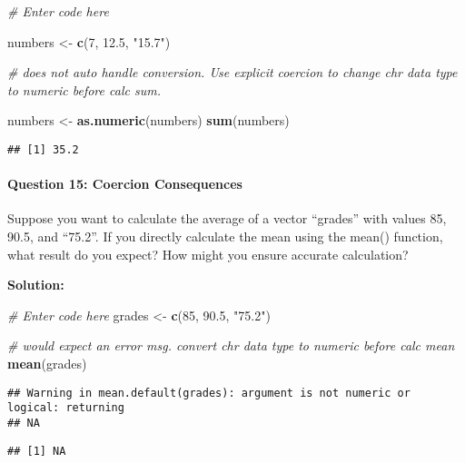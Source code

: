 \documentclass[
]{article}
\newenvironment{Shaded}{\begin{snugshade}}{\end{snugshade}}
\newcommand{\CommentTok}[1]{\textcolor[rgb]{0.56,0.35,0.01}{\textit{#1}}}
\newcommand{\DecValTok}[1]{\textcolor[rgb]{0.00,0.00,0.81}{#1}}
\newcommand{\FloatTok}[1]{\textcolor[rgb]{0.00,0.00,0.81}{#1}}
\newcommand{\FunctionTok}[1]{\textcolor[rgb]{0.13,0.29,0.53}{\textbf{#1}}}
\newcommand{\NormalTok}[1]{#1}
\newcommand{\OtherTok}[1]{\textcolor[rgb]{0.56,0.35,0.01}{#1}}
\newcommand{\StringTok}[1]{\textcolor[rgb]{0.31,0.60,0.02}{#1}}
\begin{document}
\begin{Shaded}
\begin{Highlighting}[]
\CommentTok{\# Enter code here}

\NormalTok{numbers }\OtherTok{\textless{}{-}} \FunctionTok{c}\NormalTok{(}\DecValTok{7}\NormalTok{, }\FloatTok{12.5}\NormalTok{, }\StringTok{"15.7"}\NormalTok{)}

\CommentTok{\# does not auto handle conversion. Use explicit coercion to change chr data type to numeric before calc sum.}

\NormalTok{numbers }\OtherTok{\textless{}{-}} \FunctionTok{as.numeric}\NormalTok{(numbers)}
\FunctionTok{sum}\NormalTok{(numbers)}
\end{Highlighting}
\end{Shaded}

\begin{verbatim}
## [1] 35.2
\end{verbatim}

\hypertarget{question-15-coercion-consequences}{%
\paragraph{Question 15: Coercion
Consequences}\label{question-15-coercion-consequences}}

Suppose you want to calculate the average of a vector ``grades'' with
values 85, 90.5, and ``75.2''. If you directly calculate the mean using
the mean() function, what result do you expect? How might you ensure
accurate calculation?

\textbf{Solution:}

\begin{Shaded}
\begin{Highlighting}[]
\CommentTok{\# Enter code here}
\NormalTok{grades }\OtherTok{\textless{}{-}} \FunctionTok{c}\NormalTok{(}\DecValTok{85}\NormalTok{, }\FloatTok{90.5}\NormalTok{, }\StringTok{"75.2"}\NormalTok{)}

\CommentTok{\# would expect an error msg. convert chr data type to numeric before calc mean}
\FunctionTok{mean}\NormalTok{(grades)}
\end{Highlighting}
\end{Shaded}

\begin{verbatim}
## Warning in mean.default(grades): argument is not numeric or logical: returning
## NA
\end{verbatim}

\begin{verbatim}
## [1] NA
\end{verbatim}
\end{document}
